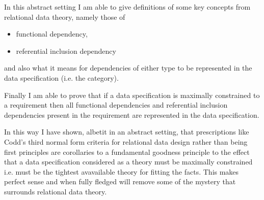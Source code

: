 \documentclass[10pt,a4paper]{article}
\theoremstyle{remark}
\begin{document}
In this abstract setting I am able to give definitions of some key concepts from relational data theory, namely
those of
\begin{itemize}
\item functional dependency,
\item referential inclusion dependency
\end{itemize}
and also what it means for dependencies of either type to be represented in the data specification (i.e. the category).

Finally I am able to prove that if a data specification is maximally constrained to a requirement then
all functional dependencies and referential inclusion dependencies present in the requirement are represented in the data
specification.

In this way I have shown,  albetit in an abstract setting, that prescriptions like Codd's third normal form criteria 
for relational data design rather than being first principles are corollaries to a fundamental goodness principle to the effect that a data specification considered as a theory must be maximally constrained i.e. must be the tightest avavailable theory for fitting the facts.
This makes perfect sense and when fully fledged will remove some of the mystery that surrounds  relational data theory. \\
\end{document}
